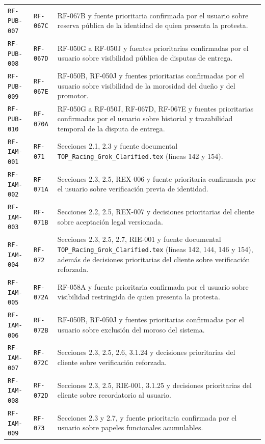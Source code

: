 \documentclass[10pt,letterpaper]{article}
\begin{document}
\begin{landscape}
\begin{longtable}{P{2.7cm}P{2.6cm}P{15.7cm}}
\texttt{RF-PUB-007} & \texttt{RF-067C} & RF-067B y fuente prioritaria confirmada por el usuario sobre reserva pública de la identidad de quien presenta la protesta.\\
\texttt{RF-PUB-008} & \texttt{RF-067D} & RF-050G a RF-050J y fuentes prioritarias confirmadas por el usuario sobre visibilidad pública de disputas de entrega.\\
\texttt{RF-PUB-009} & \texttt{RF-067E} & RF-050B, RF-050J y fuentes prioritarias confirmadas por el usuario sobre visibilidad de la morosidad del dueño y del promotor.\\
\texttt{RF-PUB-010} & \texttt{RF-070A} & RF-050G a RF-050J, RF-067D, RF-067E y fuentes prioritarias confirmadas por el usuario sobre historial y trazabilidad temporal de la disputa de entrega.\\
\texttt{RF-IAM-001} & \texttt{RF-071} & Secciones 2.1, 2.3 y fuente documental \texttt{TOP\_Racing\_Grok\_Clarified.tex} (líneas 142 y 154).\\
\texttt{RF-IAM-002} & \texttt{RF-071A} & Secciones 2.3, 2.5, REX-006 y fuente prioritaria confirmada por el usuario sobre verificación previa de identidad.\\
\texttt{RF-IAM-003} & \texttt{RF-071B} & Secciones 2.2, 2.5, REX-007 y decisiones prioritarias del cliente sobre aceptación legal versionada.\\
\texttt{RF-IAM-004} & \texttt{RF-072} & Secciones 2.3, 2.5, 2.7, RIE-001 y fuente documental \texttt{TOP\_Racing\_Grok\_Clarified.tex} (líneas 142, 144, 146 y 154), además de decisiones prioritarias del cliente sobre verificación reforzada.\\
\texttt{RF-IAM-005} & \texttt{RF-072A} & RF-058A y fuente prioritaria confirmada por el usuario sobre visibilidad restringida de quien presenta la protesta.\\
\texttt{RF-IAM-006} & \texttt{RF-072B} & RF-050B, RF-050J y fuentes prioritarias confirmadas por el usuario sobre exclusión del moroso del sistema.\\
\texttt{RF-IAM-007} & \texttt{RF-072C} & Secciones 2.3, 2.5, 2.6, 3.1.24 y decisiones prioritarias del cliente sobre verificación reforzada.\\
\texttt{RF-IAM-008} & \texttt{RF-072D} & Secciones 2.3, 2.5, RIE-001, 3.1.25 y decisiones prioritarias del cliente sobre recordatorio al usuario.\\
\texttt{RF-IAM-009} & \texttt{RF-073} & Secciones 2.3 y 2.7, y fuente prioritaria confirmada por el usuario sobre papeles funcionales acumulables.\\

\end{longtable}
\end{landscape}
\end{document}

